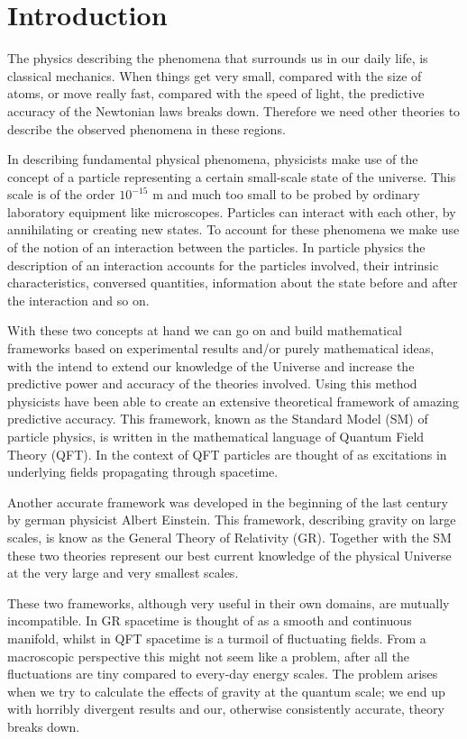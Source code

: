 \section{Introduction}
The physics describing the phenomena that surrounds us in our daily life, is classical mechanics. When things get very small, compared with the size of atoms, or move really fast, compared with the speed of light, the predictive accuracy of the Newtonian laws breaks down. Therefore we need other theories to describe the observed phenomena in these regions.

In describing fundamental physical phenomena, physicists make use of the concept of a particle representing a certain small-scale state of the universe. This scale is of the order $10^{-15}$ m and much too small to be probed by ordinary laboratory equipment like microscopes. Particles can interact with each other, by annihilating or creating new states. To account for these phenomena we make use of the notion of an interaction between the particles. In particle physics the description of an interaction accounts for the particles involved, their intrinsic characteristics, conversed quantities, information about the state before and after the interaction and so on.

With these two concepts at hand we can go on and build mathematical frameworks based on experimental results and/or purely mathematical ideas, with the intend to extend our knowledge of the Universe and increase the predictive power and accuracy of the theories involved. Using this method physicists have been able to create an extensive theoretical framework of amazing predictive accuracy. This framework, known as the Standard Model (SM) of particle physics, is written in the mathematical language of Quantum Field Theory (QFT). In the context of QFT particles are thought of as excitations in underlying fields propagating through spacetime.

Another accurate framework was developed in the beginning of the last century by german physicist Albert Einstein. This framework, describing gravity on large scales, is know as the General Theory of Relativity (GR). Together with the SM these two theories represent our best current knowledge of the physical Universe at the very large and very smallest scales.

These two frameworks, although very useful in their own domains, are mutually incompatible. In GR spacetime is thought of as a smooth and continuous manifold, whilst in QFT spacetime is a turmoil of fluctuating fields. From a macroscopic perspective this might not seem like a problem, after all the fluctuations are tiny compared to every-day energy scales. The problem arises when we try to calculate the effects of gravity at the quantum scale; we end up with horribly divergent results and our, otherwise consistently accurate, theory breaks down.

